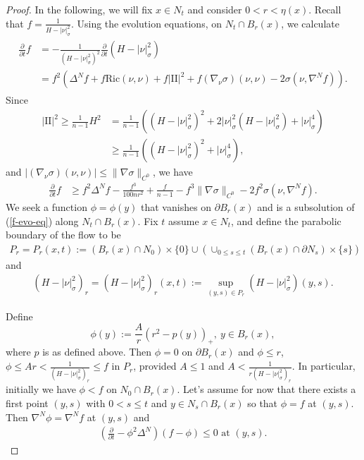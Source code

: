 \documentclass[11pt, letterpaper]{amsart}
\theoremstyle{definition}
\theoremstyle{remark}
\begin{document}
\begin{appendix}
\begin{proof}
	In the following, we will fix $x \in N_t$ and consider $0<r< \eta (x)$.
Recall that $f = \frac{1}{H- |\nu |^2_{\sigma }}$. Using the evolution equations, on $N_t \cap B_r(x)$, we calculate
	\begin{align}\label{f-evo-eq}
		\begin{split}
			\frac{\partial }{\partial t} f &= - \frac{1}{(H-|\nu |^2_\sigma )^2} \frac{\partial }{\partial t}(H-|\nu |^2_\sigma )\\
						  &= f^2 \left( \Delta ^{N} f + f \mathrm{Ric}(\nu ,\nu ) + f |\mathrm{II}|^2 + f(\nabla _{\nu }\sigma )(\nu ,\nu ) - 2 \sigma (\nu , \nabla ^{N} f) \right).
		\end{split}	
	\end{align}
	Since
	\begin{align*}
		|\mathrm{II}|^2 \geq \frac{1}{n-1} H^2 &= \frac{1}{n-1}\left( (H-|\nu |^2_\sigma )^2 + 2|\nu |^2_\sigma (H-|\nu |^2_\sigma ) + |\nu |^4_{\sigma } \right) \\
						     &\geq \frac{1}{n-1}\left( (H-|\nu |^2_\sigma )^2 + |\nu |^4_\sigma  \right) ,
	\end{align*} 
	and $|(\nabla _{\nu }\sigma )(\nu ,\nu )| \leq  \|\nabla \sigma \|_{C^0}$, we have
	\begin{align*}
		\frac{\partial }{\partial t} f &\geq f^2 \Delta ^{N} f - \frac{f^3}{100 n r ^2} + \frac{f}{n-1} -  f^3 \|\nabla \sigma \|_{C^0} - 2 f ^2 \sigma(\nu , \nabla ^{N} f). 
	\end{align*} 
	We seek a function $\phi = \phi (y)$ that vanishes on $\partial B_r(x)$ and is a subsolution of (\ref{f-evo-eq}) along $N_t \cap B_r(x)$. Fix $t$ assume $x \in N_t$, and define the parabolic boundary of the flow to be
	\begin{align*}
		P_r = P_r(x,t) := (B_r(x) \cap N_0) \times \{0\} \cup ( \cup _{0 \leq s \leq t} (B_r(x) \cap \partial N_s) \times \{s\} )
	\end{align*} 
	and
	\begin{align*}
		(H-|\nu |^2_\sigma )_r = (H- |\nu |^2_\sigma )_r(x,t):= \sup_{(y,s) \in P_r} (H- |\nu |^2_\sigma )(y,s).
	\end{align*} 

	Define
	$$\phi (y):= \frac{A}{r}(r ^2 - p(y) )_{+} ,\ y \in B_r(x),$$ 
	where $p$ is as defined above. Then $\phi =0$ on $\partial B_r(x)$ and $\phi \leq r$, $\phi \leq A r < \frac{1}{(H-|\nu |^2_\sigma )_r}\leq  f$ in $P_r$, provided $A \leq 1$ and $A < \frac{1}{r(H-|\nu |^2_\sigma )_r}$. In particular, initially we have $\phi < f$ on $N_0 \cap B_r(x)$. Let's assume for now that there exists a first point $(y, s)$ with $0<s \leq t$ and $y \in N_s \cap B_r(x)$ so that $\phi = f$ at $(y,s)$. Then $\nabla ^{N} \phi = \nabla ^{N} f $ at $(y,s)$ and 
	\begin{align*}
		\left( \frac{\partial }{\partial t} - \phi ^2 \Delta ^{N} \right) (f- \phi )  \leq 0 \text{ at } (y,s).
	\end{align*} 


\end{proof}
\end{appendix}
\end{document}
